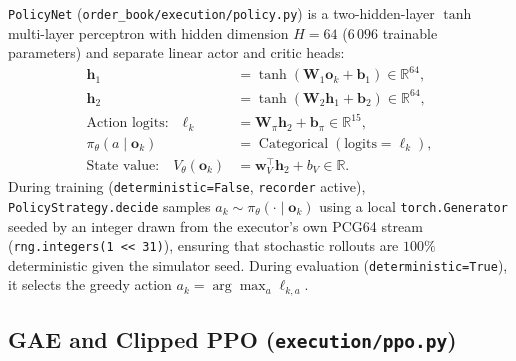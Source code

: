 \documentclass[11pt,a4paper]{article}
\newcommand{\code}[1]{\texttt{#1}}
\begin{document}
\code{PolicyNet} (\code{order\_book/execution/policy.py}) is a two-hidden-layer $\tanh$ multi-layer
perceptron with hidden dimension $H = 64$ ($6\,096$ trainable parameters) and separate linear actor and
critic heads:
\begin{align}
  \mathbf{h}_1 &= \tanh(\mathbf{W}_1 \mathbf{o}_k + \mathbf{b}_1) \in \mathbb{R}^{64}, \\
  \mathbf{h}_2 &= \tanh(\mathbf{W}_2 \mathbf{h}_1 + \mathbf{b}_2) \in \mathbb{R}^{64}, \\
  \text{Action logits:}\quad \boldsymbol{\ell}_k &= \mathbf{W}_{\pi} \mathbf{h}_2 + \mathbf{b}_{\pi} \in \mathbb{R}^{15}, \\
  \pi_\theta(a \mid \mathbf{o}_k) &= \operatorname{Categorical}(\text{logits}=\boldsymbol{\ell}_k), \\
  \text{State value:}\quad V_\theta(\mathbf{o}_k) &= \mathbf{w}_V^\top \mathbf{h}_2 + b_V \in \mathbb{R}.
\end{align}
During training (\code{deterministic=False}, \code{recorder} active), \code{PolicyStrategy.decide}
samples $a_k \sim \pi_\theta(\cdot \mid \mathbf{o}_k)$ using a local \code{torch.Generator} seeded by an
integer drawn from the executor's own PCG64 stream (\code{rng.integers(1 << 31)}), ensuring that
stochastic rollouts are $100\%$ deterministic given the simulator seed. During evaluation
(\code{deterministic=True}), it selects the greedy action $a_k = \arg\max_a \ell_{k,a}$.

\subsection[GAE and Clipped PPO]{GAE and Clipped PPO (\code{execution/ppo.py})}
\end{document}
